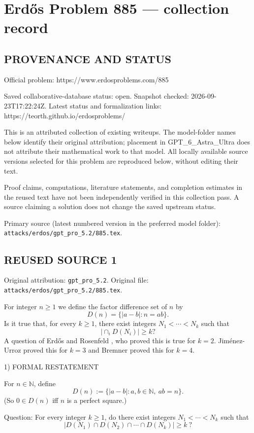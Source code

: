 \section*{Erd\H{o}s Problem 885 --- collection record}

\subsection*{PROVENANCE AND STATUS}
Official problem: https://www.erdosproblems.com/885

Saved collaborative-database status: open.
Snapshot checked: 2026-09-23T17:22:24Z.
Latest status and formalization links: https://teorth.github.io/erdosproblems/

This is an attributed collection of existing writeups. The model-folder names below identify their original attribution; placement in GPT\_6\_Astra\_Ultra does not attribute their mathematical work to that model. All locally available source versions selected for this problem are reproduced below, without editing their text.

Proof claims, computations, literature statements, and completion estimates in the reused text have not been independently verified in this collection pass. A source claiming a solution does not change the saved upstream status.

Primary source (latest numbered version in the preferred model folder): \texttt{attacks/erdos/gpt\_pro\_5.2/885.tex}.

\subsection*{REUSED SOURCE 1}
Original attribution: \texttt{gpt\_pro\_5.2}.
Original file: \texttt{attacks/erdos/gpt\_pro\_5.2/885.tex}.


For integer $n\geq 1$ we define the factor difference set of $n$ by
\[D(n) = \{\lvert a-b\rvert : n=ab\}.\]
Is it true that, for every $k\geq 1$, there exist integers $N_1<\cdots<N_k$ such that
\[\lvert \cap_i D(N_i)\rvert \geq k?\]
A question of Erd\H{o}s and Rosenfeld \cite{ErRo97}, who proved this is true for $k=2$. Jim\'{e}nez-Urroz \cite{Ji99} proved this for $k=3$ and Bremner \cite{Br19} proved this for $k=4$.

1) FORMAL RESTATEMENT

For $n\in\mathbb N$, define
\[D(n):=\{ |a-b| : a,b\in\mathbb N,\ ab=n\}.
\]
(So $0\in D(n)$ iff $n$ is a perfect square.)

Question: For every integer $k\ge 1$, do there exist integers $N_1<\cdots<N_k$ such that
\[\big|D(N_1)\cap D(N_2)\cap\cdots\cap D(N_k)\big|\ge k\ ?\]

